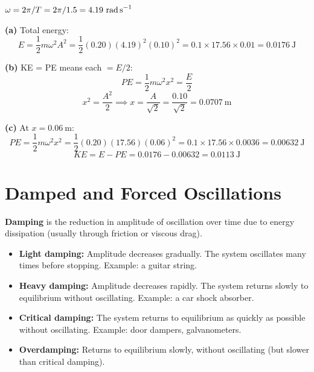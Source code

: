 \begin{solutionbox}
$\omega = 2\pi/T = 2\pi/1.5 = 4.19\ \text{rad\,s}^{-1}$

\textbf{(a)} Total energy:
\[
  E = \frac{1}{2}m\omega^2 A^2
  = \frac{1}{2}(0.20)(4.19)^2(0.10)^2
  = 0.1 \times 17.56 \times 0.01
  = 0.0176\ \text{J}
\]

\textbf{(b)} KE = PE means each $= E/2$:
\[
  PE = \frac{1}{2}m\omega^2 x^2 = \frac{E}{2}
\]
\[
  x^2 = \frac{A^2}{2} \implies x = \frac{A}{\sqrt{2}}
  = \frac{0.10}{\sqrt{2}} = 0.0707\ \text{m}
\]

\textbf{(c)} At $x = 0.06\ \text{m}$:
\[
  PE = \frac{1}{2}m\omega^2 x^2
  = \frac{1}{2}(0.20)(17.56)(0.06)^2
  = 0.1 \times 17.56 \times 0.0036
  = 0.00632\ \text{J}
\]
\[
  KE = E - PE = 0.0176 - 0.00632 = 0.0113\ \text{J}
\]
\end{solutionbox}

\section{Damped and Forced Oscillations}

\begin{definitionbox}[Damping]
\textbf{Damping} is the reduction in amplitude of
oscillation over time due to energy dissipation
(usually through friction or viscous drag).

\begin{itemize}[noitemsep]
  \item \textbf{Light damping:} Amplitude decreases
  gradually. The system oscillates many times before
  stopping. Example: a guitar string.
  \item \textbf{Heavy damping:} Amplitude decreases
  rapidly. The system returns slowly to equilibrium
  without oscillating. Example: a car shock absorber.
  \item \textbf{Critical damping:} The system returns
  to equilibrium as quickly as possible without
  oscillating. Example: door dampers, galvanometers.
  \item \textbf{Overdamping:} Returns to equilibrium
  slowly, without oscillating (but slower than
  critical damping).
\end{itemize}
\end{definitionbox}

